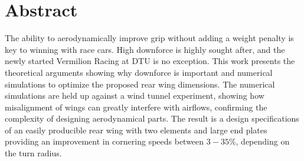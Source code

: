 \vspace{6cm}
\chapter*{Abstract}

The ability to aerodynamically improve grip without adding a weight penalty is key to winning with race cars. High downforce is highly sought after, and the newly started Vermilion Racing at DTU is no exception. This work presents the theoretical arguments showing why downforce is important and numerical simulations to optimize the proposed rear wing dimensions. The numerical simulations are held up against a wind tunnel experiment, showing how misalignment of wings can greatly interfere with airflows, confirming the complexity of designing aerodynamical parts. The result is a design specifications of an easily producible rear wing with two elements and large end plates providing an improvement in cornering speeds between $3-35\%$, depending on the turn radius. 

